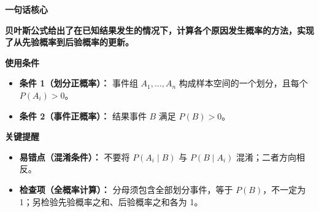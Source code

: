 \begin{summarybox}
	\textbf{\textcolor{CSummary}{一句话核心}}

	\textbf{贝叶斯公式给出了在已知结果发生的情况下，计算各个原因发生概率的方法，实现了从先验概率到后验概率的更新。}

	\medskip
	\textbf{\textcolor{CSummary}{使用条件}}
	\begin{itemize}[leftmargin=*, itemsep=0.5em, topsep=0.4em]
		\item \textbf{条件 1（划分正概率）：} 事件组 $A_1,\dots,A_n$ 构成样本空间的一个划分，且每个 $P(A_i)>0$。
		\item \textbf{条件 2（事件正概率）：} 结果事件 $B$ 满足 $P(B)>0$。
	\end{itemize}

	\medskip
	\textbf{\textcolor{CSummary}{关键提醒}}
	\begin{itemize}[leftmargin=*, itemsep=0.5em, topsep=0.4em]
		\item \textbf{易错点（混淆条件）：} 不要将 $P(A_i\mid B)$ 与 $P(B\mid A_i)$ 混淆；二者方向相反。
		\item \textbf{检查项（全概率计算）：} 分母须包含全部划分事件，等于 $P(B)$，不一定为 1；另检验先验概率之和、后验概率之和各为 1。
	\end{itemize}
\end{summarybox}
